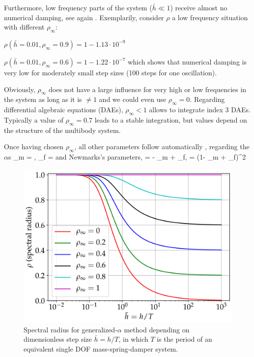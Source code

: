 Furthermore, low frequency parts of the system ($\bar h \ll 1$) receive almost no numerical damping, see again . 
Exemplarily, consider $\rho$ a low frequency situation with different $\rho_\infty$:
\bi
  \item $\rho(\bar h=0.01, \rho_\infty=0.9) = 1 - 1.13\cdot 10^{-9}$
  \item $\rho(\bar h=0.01, \rho_\infty=0.6) = 1 - 1.22\cdot 10^{-7}$
\ei
which shows that numerical damping is very low for moderately small step sizes (100 steps for one oscillation).

Obviously, $\rho_\infty$ does not have a large influence for very high or low frequencies in the system as long as it is $\neq 1$ and we could even use $\rho_\infty=0$.
Regarding differential algebraic equations (DAEs), $\rho_\infty<1$ allows to integrate index 3 DAEs. Typically a value of $\rho_\infty=0.7$ leads to a stable integration, but values depend on the structure of the multibody system.

Once having chosen $\rho_\infty$, all other parameters follow automatically \cite{Chung1993}, regarding the $\alpha$s
\be
  \alpha_m = , \quad
  \alpha_f = 
\ee
and Newmarks's parameters,
\be
  \gamma =  - \alpha_m + \alpha_f, \quad 
  \beta = (1- \alpha_m + \alpha_f)^2
\ee

\begin{figure}[tbh]%
\begin{center}
\includegraphics[width=0.6\columnwidth]{figures/spectralRadiusZeta0}%
\end{center}
\caption{Spectral radius for generalized-$\alpha$ method depending on dimensionless step size $\bar h=h/T$, in which
$T$ is the period of an equivalent single DOF mass-spring-damper system.}%
\label{fig:spectralRadius}%
\end{figure}


